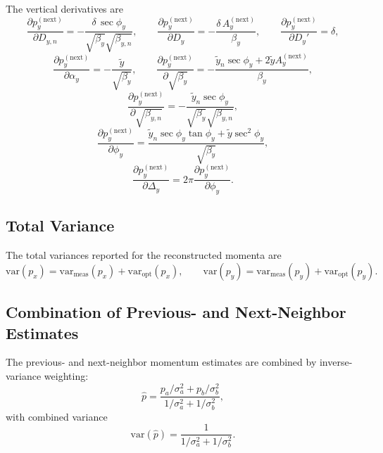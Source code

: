 The vertical derivatives are
\begin{equation}
\frac{\partial p_y^{(\mathrm{next})}}{\partial D_{y,n}}
=
- \frac{\delta\,\sec\phi_y}{\sqrt{\beta_y}\sqrt{\beta_{y,n}}},
\qquad
\frac{\partial p_y^{(\mathrm{next})}}{\partial D_y}
=
- \frac{\delta\,A_y^{(\mathrm{next})}}{\beta_y},
\qquad
\frac{\partial p_y^{(\mathrm{next})}}{\partial D_y'}
=
\delta,
\end{equation}
\begin{equation}
\frac{\partial p_y^{(\mathrm{next})}}{\partial \alpha_y}
=
- \frac{\tilde y}{\sqrt{\beta_y}},
\qquad
\frac{\partial p_y^{(\mathrm{next})}}{\partial \sqrt{\beta_y}}
=
- \frac{\tilde y_n \sec\phi_y + 2\tilde y A_y^{(\mathrm{next})}}{\beta_y},
\end{equation}
\begin{equation}
\frac{\partial p_y^{(\mathrm{next})}}{\partial \sqrt{\beta_{y,n}}}
=
- \frac{\tilde y_n \sec\phi_y}{\sqrt{\beta_y}\sqrt{\beta_{y,n}}},
\end{equation}
\begin{equation}
\frac{\partial p_y^{(\mathrm{next})}}{\partial \phi_y}
=
\frac{\tilde y_n \sec\phi_y\tan\phi_y + \tilde y \sec^2\phi_y}{\sqrt{\beta_y}},
\end{equation}
\begin{equation}
\frac{\partial p_y^{(\mathrm{next})}}{\partial \Delta_y}
=
2\pi \frac{\partial p_y^{(\mathrm{next})}}{\partial \phi_y}.
\end{equation}

\subsection{Total Variance}

The total variances reported for the reconstructed momenta are
\begin{equation}
\mathrm{var}(p_x)
=
\mathrm{var}_{\mathrm{meas}}(p_x)
+
\mathrm{var}_{\mathrm{opt}}(p_x),
\qquad
\mathrm{var}(p_y)
=
\mathrm{var}_{\mathrm{meas}}(p_y)
+
\mathrm{var}_{\mathrm{opt}}(p_y).
\end{equation}

\subsection{Combination of Previous- and Next-Neighbor Estimates}

The previous- and next-neighbor momentum estimates are combined by
inverse-variance weighting:
\begin{equation}
\hat p
=
\frac{p_a/\sigma_a^2 + p_b/\sigma_b^2}
{1/\sigma_a^2 + 1/\sigma_b^2},
\end{equation}
with combined variance
\begin{equation}
\mathrm{var}(\hat p)
=
\frac{1}{1/\sigma_a^2 + 1/\sigma_b^2}.
\end{equation}
